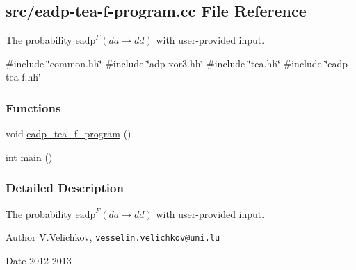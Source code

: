 \hypertarget{eadp-tea-f-program_8cc}{\subsection{src/eadp-\/tea-\/f-\/program.cc \-File \-Reference}
\label{eadp-tea-f-program_8cc}
}


\-The probability $\mathrm{eadp}^{F}(da \rightarrow dd)$ with user-\/provided input.  


{\ttfamily \#include \char`\"{}common.\-hh\char`\"{}}\*
{\ttfamily \#include \char`\"{}adp-\/xor3.\-hh\char`\"{}}\*
{\ttfamily \#include \char`\"{}tea.\-hh\char`\"{}}\*
{\ttfamily \#include \char`\"{}eadp-\/tea-\/f.\-hh\char`\"{}}\*
\subsubsection*{\-Functions}
\begin{DoxyCompactItemize}
\item 
void \hyperlink{eadp-tea-f-program_8cc_a4c27444b80704db7b2695df177241f5b}{eadp\-\_\-tea\-\_\-f\-\_\-program} ()
\item 
int \hyperlink{eadp-tea-f-program_8cc_ae66f6b31b5ad750f1fe042a706a4e3d4}{main} ()
\end{DoxyCompactItemize}


\subsubsection{\-Detailed \-Description}
\-The probability $\mathrm{eadp}^{F}(da \rightarrow dd)$ with user-\/provided input. \begin{DoxyAuthor}{\-Author}
\-V.\-Velichkov, \href{mailto:vesselin.velichkov@uni.lu}{\tt vesselin.\-velichkov@uni.\-lu} 
\end{DoxyAuthor}
\begin{DoxyDate}{\-Date}
2012-\/2013 
\end{DoxyDate}



